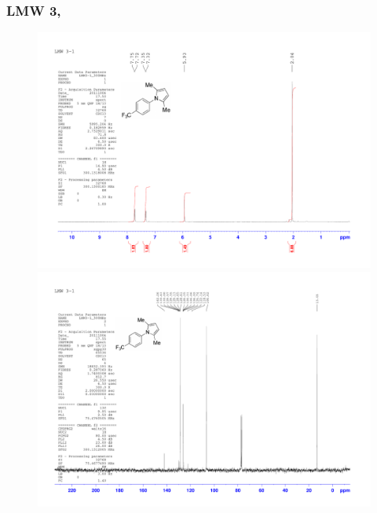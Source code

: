 \documentclass[12pt, a4paper,titlepage]{article}
\begin{document}
{\subsubsection*{LMW 3, \pageref{exp:LMW3}}
\label{spec:LMW3}
	\begin{figure}[H] 
	\begin{center}
	\includegraphics[width=14.5cm]{expdata/LMW3/1H}
	\includegraphics[width=14.5cm]{expdata/LMW3/13C}
	\end{center}
	\end{figure}

}
\end{document}
